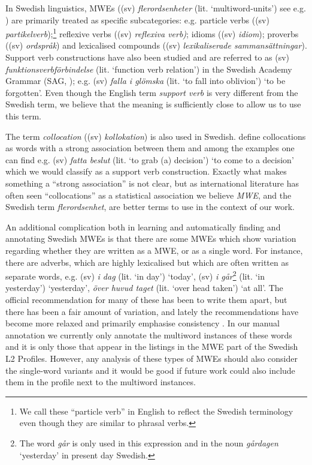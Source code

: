 \documentclass[output=paper,colorlinks,citecolor=brown]{langscibook}
\begin{document}
In Swedish linguistics, MWEs  ((sv) \textit{flerordsenheter} (lit. `multiword-units') see e.g. \cite{prentice2013flerordsenheter}) are primarily treated as specific subcategories: e.g. particle verbs ((sv) \textit{partikelverb});\footnote{We call these “particle verb” in English to reflect the Swedish terminology even though they are similar to phrasal verbs.} reflexive verbs ((sv) \textit{reflexiva verb)}; idioms ((sv) \textit{idiom}); proverbs ((sv) \textit{ordspråk}) and lexicalised compounds ((sv) \textit{lexikaliserade sammansättningar}). Support verb constructions have also been studied and are referred to as (sv) \textit{funktionsverbförbindelse} (lit. ‘function verb relation’) in the Swedish Academy Grammar (SAG, \cite{teleman1999svenska}); e.g. (sv) \textit{falla i glömska} 
(lit. `to fall into oblivion') `to be forgotten'. Even though the English term \textit{support verb} is very different from the Swedish term, we believe that the meaning is sufficiently close to allow us to use this term. 

The term \textit{collocation} ((sv) \textit{kollokation}) is also used in Swedish. \citet{prentice2013flerordsenheter} define collocations as words with a strong association between them and among the examples one can find e.g. (sv) \textit{fatta beslut}
(lit. `to grab (a) decision') `to come to a decision' which we would classify as a support verb construction. Exactly what makes something a “strong association” is not clear, but as 
international literature has often seen “collocations” as a statistical association we believe \textit{MWE}, and the Swedish term \textit{flerordsenhet}, are better terms to use in the context of our work. 

An additional complication both in learning and automatically finding and annotating Swedish MWEs is that there are some MWEs which show variation regarding whether they are written as a MWE, or as a single word. For instance, there are adverbs, which are highly lexicalised but which are often written as separate words, e.g. (sv) \textit{i dag}
(lit. `in day') `today', (sv) 
\textit{i går}\footnote{The word \textit{går} is only used in this expression and in the noun \textit{gårdagen} `yesterday' in present day Swedish.}  
(lit. `in yesterday') `yesterday', \textit{över huvud taget} 
(lit. `over head taken') `at all'. The official recommendation for many of these has been to write them apart, but there has been a fair amount of variation, and lately the recommendations have become more relaxed and primarily emphasise consistency \citep[cf.][]{karlsson2017svenska,akademien2015svenska}. In our manual annotation we currently only annotate the multiword instances of these words and it is only those that appear in the listings in the MWE part of the Swedish L2 Profiles. However, any analysis of these types of MWEs should also consider the single-word variants  
and it would be good if future work could also include them in the profile next to the multiword instances. 
\end{document}
